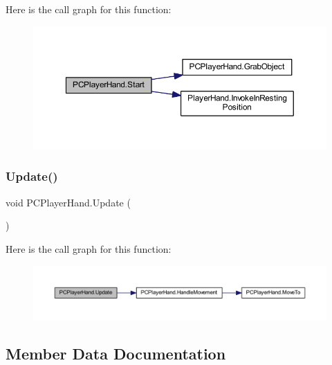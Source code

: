 Here is the call graph for this function\+:\nopagebreak
\begin{figure}[H]
\begin{center}
\leavevmode
\includegraphics[width=350pt]{class_p_c_player_hand_aa3eed40e80c66f9e85905cf2c2c4fcbe_cgraph}
\end{center}
\end{figure}
\mbox{\label{class_p_c_player_hand_a1fec11a83fbd674a2a0ff6790704a847}} 
\subsubsection{\texorpdfstring{Update()}{Update()}}
{\footnotesize\ttfamily void P\+C\+Player\+Hand.\+Update (\begin{DoxyParamCaption}{ }\end{DoxyParamCaption})\hspace{0.3cm}{\ttfamily [private]}}

Here is the call graph for this function\+:\nopagebreak
\begin{figure}[H]
\begin{center}
\leavevmode
\includegraphics[width=350pt]{class_p_c_player_hand_a1fec11a83fbd674a2a0ff6790704a847_cgraph}
\end{center}
\end{figure}


\subsection{Member Data Documentation}
\mbox{\label{class_p_c_player_hand_a25ff91db9893158f5185b4826d563e60}} 
